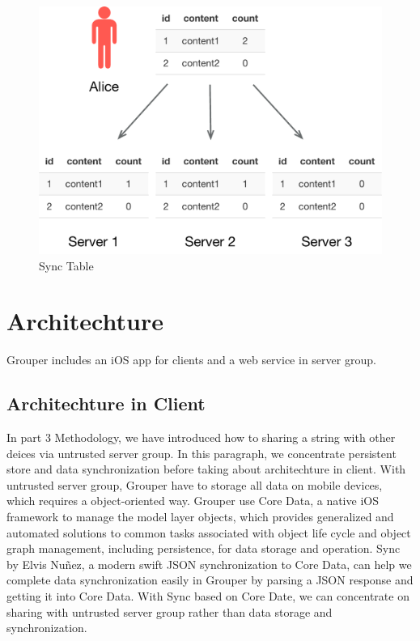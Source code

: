 \documentclass[twocolumn,10pt]{article}
\begin{document}
\begin{figure}[t]
\centering
\includegraphics[scale=0.4]{sync_table}
\caption{Sync Table}
\end{figure}

\section{Architechture}
Grouper includes an iOS app for clients and a web service in server group.

\subsection{Architechture in Client}
In part 3 Methodology, we have introduced how to sharing a string with other deices via untrusted server group. In this paragraph, we concentrate persistent store and data synchronization before taking about architechture in client. With untrusted server group, Grouper have to storage all data on mobile devices, which requires a object-oriented way. Grouper use Core Data\cite{coredata}, a native iOS framework to manage the model layer objects, which provides generalized and automated solutions to common tasks associated with object life cycle and object graph management, including persistence, for data storage and operation. Sync\cite{sync} by Elvis Nuñez, a modern swift JSON synchronization to Core Data, can help we complete data synchronization easily in Grouper by parsing a JSON response and getting it into Core Data. With Sync based on Core Date, we can concentrate on sharing with untrusted server group rather than data storage and synchronization.
\end{document}
